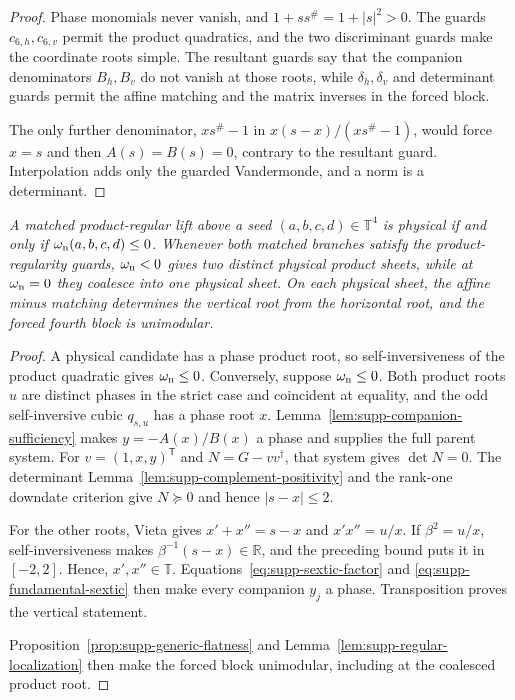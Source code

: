 \documentclass[aps,prx,reprint,nofootinbib,twoside,superscriptaddress,longbibliography,floatfix]{revtex4-2}
\theoremstyle{definition}
\newcommand{\T}{\mathbb T}
\begin{document}
\begin{proof}
Phase monomials never vanish, and $1+ss^\#=1+|s|^2>0$. The guards $c_{6,h},c_{6,v}$ permit the product quadratics, and the two discriminant guards make the coordinate roots simple. The resultant guards say that the companion denominators $B_h,B_v$ do not vanish at those roots, while $\delta_h,\delta_v$ and determinant guards permit the affine matching and the matrix inverses in the forced block.

{The only further denominator, $xs^\#-1$ in $x(s-x)/(xs^\#-1)$, would force $x=s$ and then $A(s)=B(s)=0$, contrary to the resultant guard.  Interpolation adds only the guarded Vandermonde, and a norm is a determinant.}
\end{proof}

{\emph{A matched product-regular lift above a seed $(a,b,c,d)\in\T^4$ is physical if and only if $\omega_{\rm n}(a,b,c,d)\leq0$. Whenever both matched branches satisfy the product-regularity guards, $\omega_{\rm n}<0$ gives two distinct physical product sheets, while at $\omega_{\rm n}=0$ they coalesce into one physical sheet. On each physical sheet, the affine minus matching determines the vertical root from the horizontal root, and the forced fourth block is unimodular.}}

\begin{proof}
A physical candidate has a phase product root, so self-inversiveness of the product quadratic gives $\omega_{\rm n}\leq0$.  Conversely, suppose $\omega_{\rm n}\leq0$. Both product roots $u$ are distinct phases in the strict case and coincident at equality, and the odd self-inversive cubic $q_{s,u}$ has a phase root $x$.  {Lemma~\ref{lem:supp-companion-sufficiency} makes $y=-A(x)/B(x)$ a phase and supplies the full parent system.  For $v=(1,x,y)^{\mathsf T}$ and $N=G-vv^\dagger$, that system gives $\det N=0$. The determinant Lemma~\ref{lem:supp-complement-positivity} and the rank-one downdate criterion give $N\succeq0$ and hence $|s-x|\le2$.}

{For the other roots, Vieta gives $x'+x''=s-x$ and $x'x''=u/x$.  If $\beta^2=u/x$, self-inversiveness makes $\beta^{-1}(s-x)\in\mathbb R$, and the preceding bound puts it in $[-2,2]$. Hence, $x',x''\in\mathbb T$.  Equations~\eqref{eq:supp-sextic-factor} and \eqref{eq:supp-fundamental-sextic} then make every companion $y_j$ a phase. Transposition proves the vertical statement.}

{Proposition~\ref{prop:supp-generic-flatness} and Lemma~\ref{lem:supp-regular-localization} then make the forced block unimodular, including at the coalesced product root.}
\end{proof}
\end{document}
